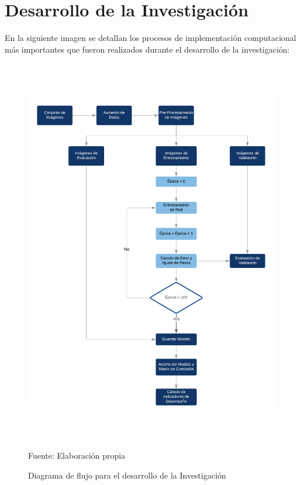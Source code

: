 \chapter{Desarrollo de la Investigación}
\setcounter{page}{82}
\renewcommand{\baselinestretch}{1.2} %

En la siguiente imagen se detallan los procesos de implementación computacional más importantes que fueron realizados durante el desarrollo de la investigación:

\begin{figure}[H]
	\begin{center}
	\includegraphics[width=1\textwidth,height=17cm]{images/summaryflowchart}
	\end{center}
	\vspace{1.5em}
	\begin{center}
	\caption{\small{Diagrama de flujo para el desarrollo de la Investigación}}
	\vskip -0.25cm
	{\small{Fuente: Elaboración propia}}
	\end{center}
	
\end{figure}


